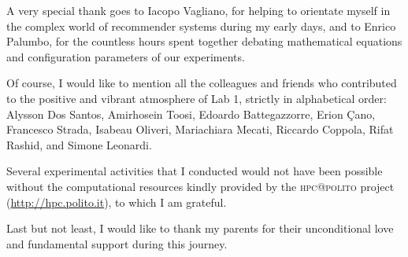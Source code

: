 A very special thank goes to Iacopo Vagliano, for helping to orientate myself in the complex world of recommender systems during my early days, and to Enrico Palumbo, for the countless hours spent together debating mathematical equations and configuration parameters of our experiments.

Of course, I would like to mention all the colleagues and friends who contributed to the positive and vibrant atmosphere of Lab 1, strictly in alphabetical order: Alysson Dos Santos, Amirhosein Toosi, Edoardo Battegazzorre, Erion {\c C}ano, Francesco Strada, Isabeau Oliveri, Mariachiara Mecati, Riccardo Coppola, Rifat Rashid, and Simone Leonardi.

Several experimental activities that I conducted would not have been possible without the computational resources kindly provided by the \textsc{hpc@polito} project (\url{http://hpc.polito.it}), to which I am grateful.

Last but not least, I would like to thank my parents for their unconditional love and fundamental support during this journey.

\tablespagetrue\figurespagetrue
\allcontents

